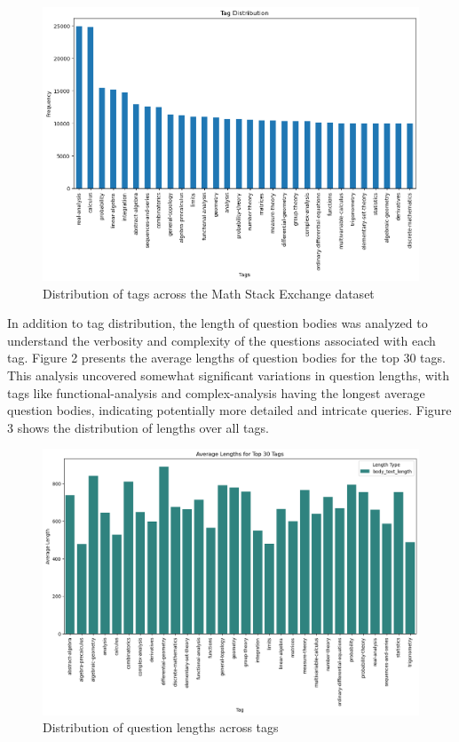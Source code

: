\documentclass[12pt, letterpaper]{article}
\begin{document}
\begin{figure}[H]
\centering
\includegraphics[scale=0.45]{../figs/exploratory_analysis/tag_distribution}
\caption{Distribution of tags across the Math Stack Exchange dataset}
\end{figure}
\par In addition to tag distribution, the length of question bodies was analyzed to understand the verbosity and complexity of the questions associated with each tag. Figure 2 presents the average lengths of question bodies for the top 30 tags. This analysis uncovered somewhat significant variations in question lengths, with tags like functional-analysis and complex-analysis having the longest average question bodies, indicating potentially more detailed and intricate queries. Figure 3 shows the distribution of lengths over all tags. 
\begin{figure}[H]
\centering
\includegraphics[scale=0.4]{../figs/exploratory_analysis/length_by_tag}
\caption{Distribution of question lengths across tags}
\end{figure}
\end{document}
